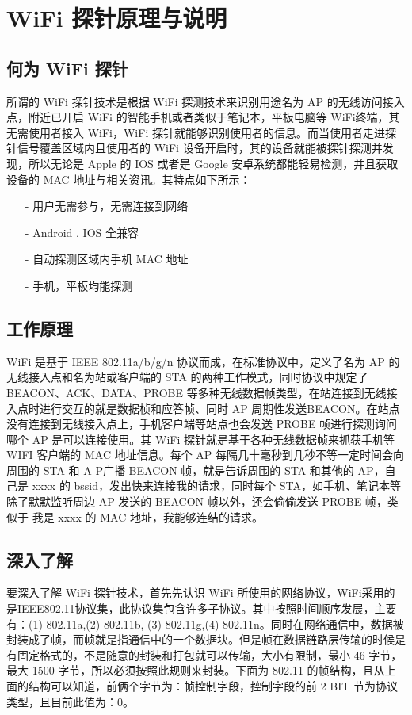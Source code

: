 \section{WiFi 探针原理与说明}

\subsection{何为 WiFi 探针}

所谓的 WiFi 探针技术是根据 WiFi 探测技术来识别用途名为 AP 的无线访问接入点，附近已开启 WiFi 的智能手机或者类似于笔记本，平板电脑等 WiFi终端，其无需使用者接入 WiFi，WiFi 探针就能够识别使用者的信息。而当使用者走进探针信号覆盖区域内且使用者的 WiFi 设备开启时，其的设备就能被探针探测并发现，所以无论是 Apple 的 IOS 或者是 Google 安卓系统都能轻易检测，并且获取设备的 MAC 地址与相关资讯。其特点如下所示：

\begin{itemize}
\item [-] 用户无需参与，无需连接到网络
\item [-] Android , IOS 全兼容
\item [-] 自动探测区域内手机 MAC 地址
\item [-] 手机，平板均能探测
\end{itemize}

\subsection{工作原理}

WiFi 是基于 IEEE 802.11a/b/g/n 协议而成，在标准协议中，定义了名为 AP 的无线接入点和名为站或客户端的 STA 的两种工作模式，同时协议中规定了 BEACON、ACK、DATA、PROBE 等多种无线数据帧类型，在站连接到无线接入点时进行交互的就是数据桢和应答帧、同时 AP 周期性发送BEACON。在站点没有连接到无线接入点上，手机客户端等站点也会发送 PROBE 帧进行探测询问哪个 AP 是可以连接使用。其 WiFi 探针就是基于各种无线数据帧来抓获手机等 WIFI 客户端的 MAC 地址信息。每个 AP 每隔几十毫秒到几秒不等一定时间会向周围的 STA 和 A P广播 BEACON 帧，就是告诉周围的 STA 和其他的 AP，自己是 xxxx 的 bssid，发出快来连接我的请求，同时每个 STA，如手机、笔记本等除了默默监听周边 AP 发送的 BEACON 帧以外，还会偷偷发送 PROBE 帧，类似于 我是 xxxx 的 MAC 地址，我能够连结的请求。

\subsection{深入了解}

要深入了解 WiFi 探针技术，首先先认识 WiFi 所使用的网络协议，WiFi采用的是IEEE802.11协议集，此协议集包含许多子协议。其中按照时间顺序发展，主要有：(1) 802.11a,(2) 802.11b, (3) 802.11g,(4) 802.11n。同时在网络通信中，数据被封装成了帧，而帧就是指通信中的一个数据块。但是帧在数据链路层传输的时候是有固定格式的，不是随意的封装和打包就可以传输，大小有限制，最小 46 字节，最大 1500 字节，所以必须按照此规则来封装。下面为 802.11 的帧结构，且从上面的结构可以知道，前俩个字节为：帧控制字段，控制字段的前 2 BIT 节为协议类型，且目前此值为：0。

